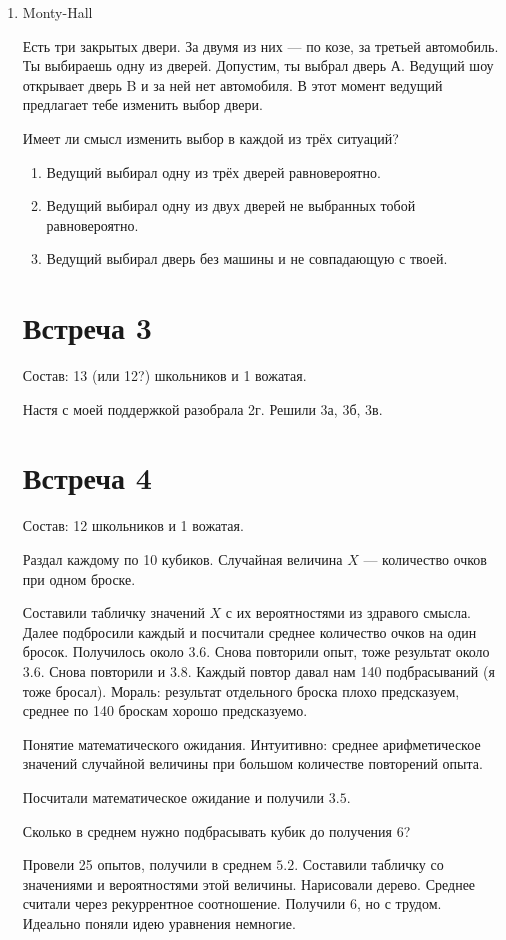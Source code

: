 \documentclass[a4paper, 12pt]{article}
\begin{document}
\begin{enumerate}
\item Monty-Hall

Есть три закрытых двери. За двумя из них — по козе, за третьей автомобиль. Ты выбираешь одну из дверей. Допустим, ты выбрал дверь А. Ведущий шоу открывает дверь B и за ней нет автомобиля.
В этот момент ведущий предлагает тебе изменить выбор двери.

Имеет ли смысл изменить выбор в каждой из трёх ситуаций?
\begin{enumerate}
  \item Ведущий выбирал одну из трёх дверей равновероятно.
  \item Ведущий выбирал одну из двух дверей не выбранных тобой равновероятно.
  \item Ведущий выбирал дверь без машины и не совпадающую с твоей.
\end{enumerate}

\newpage
\section{Встреча 3}

Состав: 13 (или 12?) школьников и 1 вожатая.

Настя с моей поддержкой разобрала 2г. Решили 3а, 3б, 3в.

\section{Встреча 4}

Состав: 12 школьников и 1 вожатая.

Раздал каждому по 10 кубиков. Случайная величина $X$ — количество очков при одном броске.

Составили табличку значений $X$ с их вероятностями из здравого смысла. Далее подбросили каждый и посчитали среднее количество очков на один бросок. Получилось около $3.6$. Снова повторили опыт, тоже результат около $3.6$. Снова повторили и $3.8$. Каждый повтор давал нам 140 подбрасываний (я тоже бросал). Мораль: результат отдельного броска плохо предсказуем, среднее по 140 броскам хорошо предсказуемо.

Понятие математического ожидания. Интуитивно: среднее арифметическое значений случайной величины при большом количестве повторений опыта.

Посчитали математическое ожидание и получили $3.5$.

Сколько в среднем нужно подбрасывать кубик до получения 6?

Провели 25 опытов, получили в среднем $5.2$. Составили табличку со значениями и вероятностями этой величины. Нарисовали дерево. Среднее считали через рекуррентное соотношение. Получили $6$, но с трудом. Идеально поняли идею уравнения немногие.


\end{enumerate}
\end{document}

